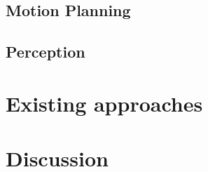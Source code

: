
\subsection{Motion Planning}


\subsection{Perception}





\section{Existing approaches}


\section{Discussion}


